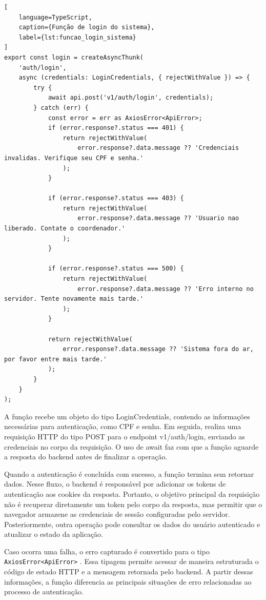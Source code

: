 \begin{lstlisting}[
    language=TypeScript,
    caption={Função de login do sistema},
    label={lst:funcao_login_sistema}
]
export const login = createAsyncThunk(
    'auth/login',
    async (credentials: LoginCredentials, { rejectWithValue }) => {
        try {
            await api.post('v1/auth/login', credentials);
        } catch (err) {
            const error = err as AxiosError<ApiError>;
            if (error.response?.status === 401) {
                return rejectWithValue(
                    error.response?.data.message ?? 'Credenciais invalidas. Verifique seu CPF e senha.'
                );
            }

            if (error.response?.status === 403) {
                return rejectWithValue(
                    error.response?.data.message ?? 'Usuario nao liberado. Contate o coordenador.'
                );
            }

            if (error.response?.status === 500) {
                return rejectWithValue(
                    error.response?.data.message ?? 'Erro interno no servidor. Tente novamente mais tarde.'
                );
            }

            return rejectWithValue(
                error.response?.data.message ?? 'Sistema fora do ar, por favor entre mais tarde.'
            );
        }
    }
);

\end{lstlisting}

A função recebe um objeto do tipo LoginCredentials, contendo as informações necessárias para autenticação, como CPF e senha. Em seguida, realiza uma requisição HTTP do tipo POST para o endpoint v1/auth/login, enviando as credenciais no corpo da requisição. O uso de await faz com que a função aguarde a resposta do backend antes de finalizar a operação.

Quando a autenticação é concluída com sucesso, a função termina sem retornar dados. Nesse fluxo, o backend é responsável por adicionar os tokens de autenticação aos cookies da resposta. Portanto, o objetivo principal da requisição não é recuperar diretamente um token pelo corpo da resposta, mas permitir que o navegador armazene as credenciais de sessão configuradas pelo servidor. Posteriormente, outra operação pode consultar os dados do usuário autenticado e atualizar o estado da aplicação.

Caso ocorra uma falha, o erro capturado é convertido para o tipo \verb|AxiosError<ApiError>| . Essa tipagem permite acessar de maneira estruturada o código de estado HTTP e a mensagem retornada pelo backend. A partir dessas informações, a função diferencia as principais situações de erro relacionadas ao processo de autenticação.

